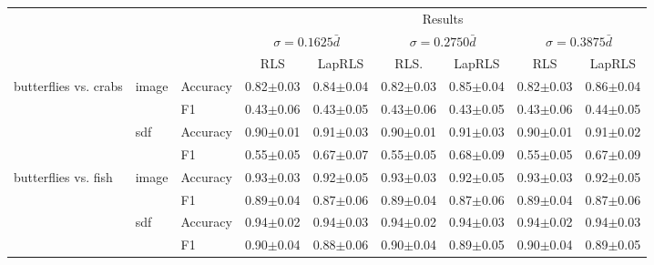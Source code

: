 \documentclass[anon,11pt]{9520} %
\begin{document}
\begin{table}
\scriptsize
\begin{center}
\begin{tabular}{l|l|l|cc|cc|cc|}
& & & \multicolumn{6}{c}{Results} \\ 
  & & & \multicolumn{2}{|c|}{$\sigma=0.1625 \bar{d}$}
       & \multicolumn{2}{|c|}{$\sigma=0.2750 \bar{d}$}
       & \multicolumn{2}{|c|}{$\sigma=0.3875 \bar{d}$}\\ 
& & & RLS & LapRLS & RLS. & LapRLS & RLS & LapRLS\\ \hline 



\multirow{4}{*}{butterflies vs. crabs}
& \multirow{2}{*}{image} & \multirow{1}{*}{Accuracy}& 0.82$\pm$0.03& 0.84$\pm$0.04& 0.82$\pm$0.03& 0.85$\pm$0.04& 0.82$\pm$0.03& 0.86$\pm$0.04\\ 
& & \multirow{1}{*}{F1}& 0.43$\pm$0.06& 0.43$\pm$0.05& 0.43$\pm$0.06& 0.43$\pm$0.05& 0.43$\pm$0.06& 0.44$\pm$0.05\\ \cline{2-9} 

& \multirow{2}{*}{sdf} & \multirow{1}{*}{Accuracy}& 0.90$\pm$0.01& 0.91$\pm$0.03& 0.90$\pm$0.01& 0.91$\pm$0.03& 0.90$\pm$0.01& 0.91$\pm$0.02\\ 
& & \multirow{1}{*}{F1}& 0.55$\pm$0.05& 0.67$\pm$0.07& 0.55$\pm$0.05& 0.68$\pm$0.09& 0.55$\pm$0.05& 0.67$\pm$0.09\\ \cline{2-9} 

\multirow{4}{*}{butterflies vs. fish}
& \multirow{2}{*}{image} & \multirow{1}{*}{Accuracy}& 0.93$\pm$0.03& 0.92$\pm$0.05& 0.93$\pm$0.03& 0.92$\pm$0.05& 0.93$\pm$0.03& 0.92$\pm$0.05\\ 
& & \multirow{1}{*}{F1}& 0.89$\pm$0.04& 0.87$\pm$0.06& 0.89$\pm$0.04& 0.87$\pm$0.06& 0.89$\pm$0.04& 0.87$\pm$0.06\\ \cline{2-9} 

& \multirow{2}{*}{sdf} & \multirow{1}{*}{Accuracy}& 0.94$\pm$0.02& 0.94$\pm$0.03& 0.94$\pm$0.02& 0.94$\pm$0.03& 0.94$\pm$0.02& 0.94$\pm$0.03\\ 
& & \multirow{1}{*}{F1}& 0.90$\pm$0.04& 0.88$\pm$0.06& 0.90$\pm$0.04& 0.89$\pm$0.05& 0.90$\pm$0.04& 0.89$\pm$0.05\\ \cline{2-9} 


\end{tabular}
\end{center}
\end{table}
\end{document}
